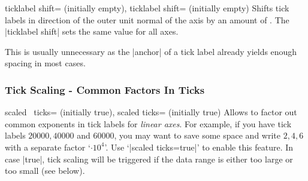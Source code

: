 \begin{pgfplotsxykeylist}{%
	\x ticklabel shift= (initially empty),%
	   ticklabel shift= (initially empty)}
	Shifts tick labels in direction of the outer unit normal of the axis by an amount of . The |ticklabel shift| sets the same value for all axes.

	This is usually unnecessary as the |anchor| of a tick label already yields enough spacing in most cases.
\end{pgfplotsxykeylist}

\subsubsection{Tick Scaling - Common Factors In Ticks}
\label{sec:scaled:ticks}%
\begin{pgfplotsxykeylist}{
	scaled \x\ ticks= (initially true),
	scaled ticks= (initially true)}
Allows to factor out common exponents in tick labels for \emph{linear axes}. For example, if you have tick labels $20000,40000$ and $60000$, you may want to save some space and write $2,4,6$ with a separate factor `$\cdot 10^4$'. Use `|scaled ticks=true|' to enable this feature. In case |true|, tick scaling will be triggered if the data range is either too large or too small (see below).
\begin{codeexample}[]
%
\end{codeexample}

\begin{codeexample}[]
\end{codeexample}


\end{pgfplotsxykeylist}
